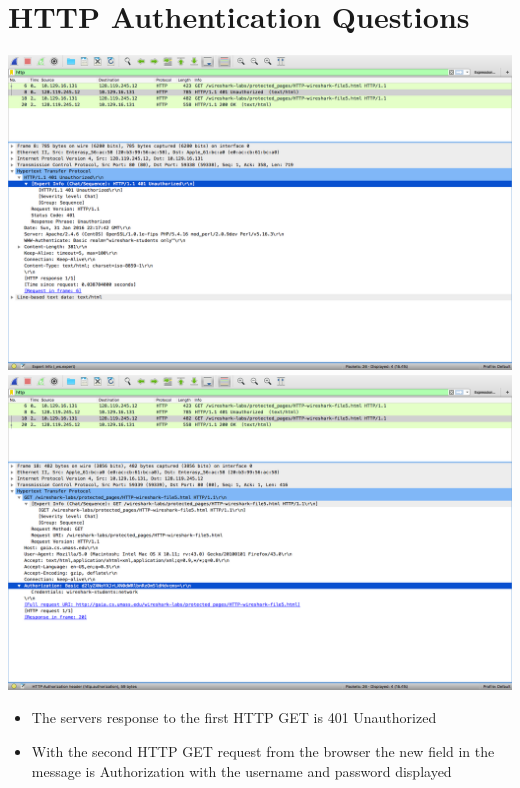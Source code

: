 \documentclass{article}
\begin{document}
\section {HTTP Authentication Questions}
\includegraphics[width=\textwidth]{HTTPAuthenticationReply}\\
\includegraphics[width=\textwidth]{HTTPAuthenticationGet}\\
\begin{itemize}
  \item The servers response to the first HTTP GET is 401 Unauthorized
  \item With the second HTTP GET request from the browser the new field in the message is Authorization with the username and password displayed
\end{itemize}
\end{document}
